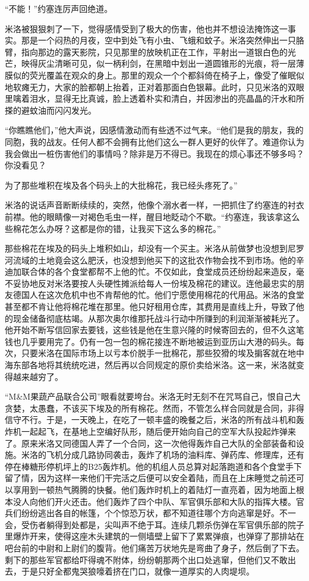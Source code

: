     “不能！”约塞连厉声回绝道。

    米洛被狠狠刺了一下，觉得感情受到了极大的伤害，他也并不想设法掩饰这一事实。那是一个闷热的月夜，空中到处飞有小虫、飞蛾和蚊子。米洛突然伸出一只胳臂，指向那边的露天影院，只见那里的放映机正在工作，平射出一道银白色的光芒，映得灰尘清晰可见，似一柄利剑，在黑暗中划出一道圆锥形的光痕，将一层薄膜似的荧光覆盖在观众的身上。那里的观众一个个都斜倚在椅子上，像受了催眠似地软瘫无力，大家的脸都朝上抬着，正对着那面白色银幕。此时，只见米洛的双眼里噙着泪水，显得无比真诚，脸上透着朴实和清白，并因渗出的亮晶晶的汗水和所搽的避蚊油而闪闪发光。

    “你瞧瞧他们，”他大声说，因感情激动而有些透不过气来。“他们是我的朋友，我的同胞，我的战友。任何人都不会拥有比他们这么一群人更好的伙伴了。难道你认为我会做出一桩伤害他们的事情吗？除非是万不得已。我现在的烦心事还不够多吗？你没看见？

    为了那些堆积在埃及各个码头上的大批棉花，我已经头疼死了。”

    米洛的说话声音断断续续的，突然，他像个溺水者一样，一把抓住了约塞连的衬衣前襟。他的眼睛像一对褐色毛虫一样，醒目地眨动个不歇。“约塞连，我该拿这么些棉花怎么办呀？这都是你的错，让我买下这么多的棉花。”

    那些棉花在埃及的码头上堆积如山，却没有一个买主。米洛从前做梦也没想到尼罗河流域的土地竟会这么肥沃，也没想到他买下的这批农作物会找不到市场。他的辛迪加联合体的各个食堂都帮不上他的忙。不仅如此，食堂成员还纷纷起来造反，毫不妥协地反对米洛要按人头硬性摊派给每人一份埃及棉花的建议。连他最忠实的朋友德国人在这次危机中也不肯帮他的忙。他们宁愿使用棉花的代用品。米洛的食堂甚至都不肯让他将棉花堆在那里。他只好租用仓库，其费用是直线上升，导致了他的现金储备彻底枯竭。从那次奥尔维那托战斗行动中所赚到的利润渐渐被耗光了。他开始不断写信回家去要钱，这些钱是他在生意兴隆的时候寄回去的，但不久这笔钱也几乎要用完了。仍有一包一包的棉花接连不断地被运到亚历山大港的码头。每次，只要米洛在国际市场上以亏本价脱手一批棉花，那些狡猾的埃及掮客就在地中海东部各地将其统统吃进，然后再以合同规定的原价卖给米洛。这一来，米洛就变得越来越穷了。
 


    “M&M果蔬产品联合公司”眼看就要垮台。米洛无时无刻不在咒骂自己，恨自己大贪婪，太愚蠢，不该买下埃及的所有棉花。然而，不管怎么样合同就是合同，非得信守不行。于是，一天晚上，在吃了一顿丰盛的晚餐之后，米洛的所有战斗机和轰炸机一起起飞，在基地上空编好队形，随后便开始向自己的空军大队投起炸弹来了。原来米洛又同德国人弄了一个合同，这一次他得轰炸自己大队的全部装备和设施。米洛的飞机分成几路协同袭击，轰炸了机场的油料库、弹药库、修理库，还有停在棒糖形停机坪上的B25轰炸机。他的机组人员总算对起落跑道和各个食堂手下留了情，因为这样一来他们干完活之后便可以安全着陆，而且在上床睡觉之前还可以享用到一顿热气腾腾的快餐。他们轰炸时机上的着陆灯一直亮着，因为地面上根本没人向他们开火还击。他们轰炸了四个中队、军官俱乐部和大队的指挥大楼。官兵们纷纷逃出各自的帐篷，个个惊恐万状，都不知道往哪个方向逃窜是好。不一会，受伤者躺得到处都是，尖叫声不绝于耳。连续几颗杀伤弹在军官俱乐部的院子里爆炸开来，使得这座木头建筑的一侧墙壁上留下了累累弹痕，也弹穿了那排站在吧台前的中尉和上尉们的腹背。他们痛苦万状地先是弯曲了身子，然后倒了下去。剩下的那些军官都给吓得魂不附体，纷纷朝那两个出口处逃窜，但他们又不敢出去，于是只好全都鬼哭狼嚎着挤在门口，就像一道厚实的人肉堤坝。

